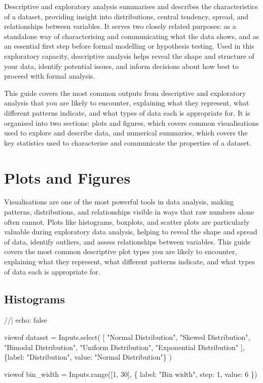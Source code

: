 \documentclass[
  letterpaper,
  DIV=11,
  numbers=noendperiod]{scrartcl}
\newenvironment{Shaded}{\begin{snugshade}}{\end{snugshade}}
\newcommand{\NormalTok}[1]{\textcolor[rgb]{0.00,0.23,0.31}{#1}}
\begin{document}
Descriptive and exploratory analysis summarises and describes the
characteristics of a dataset, providing insight into distributions,
central tendency, spread, and relationships between variables. It serves
two closely related purposes: as a standalone way of characterising and
communicating what the data shows, and as an essential first step before
formal modelling or hypothesis testing. Used in this exploratory
capacity, descriptive analysis helps reveal the shape and structure of
your data, identify potential issues, and inform decisions about how
best to proceed with formal analysis.

This guide covers the most common outputs from descriptive and
exploratory analysis that you are likely to encounter, explaining what
they represent, what different patterns indicate, and what types of data
each is appropriate for. It is organised into two sections: plots and
figures, which covers common visualisations used to explore and describe
data, and numerical summaries, which covers the key statistics used to
characterise and communicate the properties of a dataset.

\section{Plots and Figures}\label{sec-plotsandfigures}

Visualisations are one of the most powerful tools in data analysis,
making patterns, distributions, and relationships visible in ways that
raw numbers alone often cannot. Plots like histograms, boxplots, and
scatter plots are particularly valuable during exploratory data
analysis, helping to reveal the shape and spread of data, identify
outliers, and assess relationships between variables. This guide covers
the most common descriptive plot types you are likely to encounter,
explaining what they represent, what different patterns indicate, and
what types of data each is appropriate for.

\subsection{Histograms}\label{sec-histograms}

\begin{Shaded}
\begin{Highlighting}[]
\NormalTok{//| echo: false}

\NormalTok{viewof dataset = Inputs.select(}
\NormalTok{  [}
\NormalTok{    "Normal Distribution", "Skewed Distribution", "Bimodal Distribution",}
\NormalTok{    "Uniform Distribution", "Exponential Distribution"}
\NormalTok{  ],}
\NormalTok{  \{label: "Distribution", value: "Normal Distribution"\}}
\NormalTok{)}

\NormalTok{viewof bin\_width = Inputs.range([1, 30], \{}
\NormalTok{  label: "Bin width",}
\NormalTok{  step: 1,}
\NormalTok{  value: 6}
\NormalTok{\})}
\end{Highlighting}
\end{Shaded}
\end{document}
